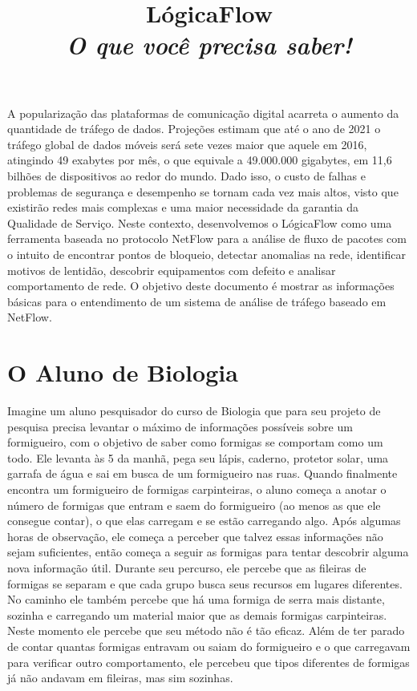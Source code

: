 \documentclass[twocolumn, letterpaper]{scrartcl}
\begin{document}
    \title{\color{triton_blue}LógicaFlow\\ \textit{O que você precisa saber!}}
    \date{}

	\maketitle

A popularização das plataformas de comunicação digital acarreta o aumento da quantidade de tráfego de dados. Projeções estimam que até o ano de 2021 o tráfego global de dados móveis será sete vezes maior que aquele em 2016, atingindo 49 exabytes por mês, o que equivale a 49.000.000 gigabytes, em 11,6 bilhões de dispositivos ao redor do mundo. Dado isso, o custo de falhas e problemas de segurança e desempenho se tornam cada vez mais altos, visto que existirão redes mais complexas e uma maior necessidade da garantia da Qualidade de Serviço. Neste contexto, desenvolvemos o LógicaFlow como uma ferramenta baseada no protocolo NetFlow para a análise de fluxo de pacotes com o intuito de encontrar pontos de bloqueio, detectar anomalias na rede, identificar motivos de lentidão, descobrir equipamentos com defeito e analisar comportamento de rede. O objetivo deste documento é mostrar as informações básicas para o entendimento de um sistema de análise de tráfego baseado em NetFlow.%

	
\section*{\color{triton_blue}O Aluno de Biologia}

 
Imagine um aluno pesquisador do curso de Biologia que para seu projeto de pesquisa precisa levantar o máximo de informações possíveis sobre um formigueiro, com o objetivo de saber como formigas se comportam como um todo. Ele levanta às 5 da manhã, pega seu lápis, caderno, protetor solar, uma garrafa de água e sai em busca de um formigueiro nas ruas. Quando finalmente encontra um formigueiro de formigas carpinteiras, o aluno começa a anotar o número de formigas que entram e saem do formigueiro (ao menos as que ele consegue contar), o que elas carregam e se estão carregando algo. Após algumas horas de observação, ele começa a perceber que talvez essas informações não sejam suficientes, então começa a seguir as formigas para tentar descobrir alguma nova informação útil. Durante seu percurso, ele percebe que as fileiras de formigas se separam e que cada grupo busca seus recursos em lugares diferentes. No caminho ele também percebe que há uma formiga de serra mais distante, sozinha e carregando um material maior que as demais formigas carpinteiras. Neste momento ele percebe que seu método não é tão eficaz. Além de ter parado de contar quantas formigas entravam ou saiam do formigueiro e o que carregavam para verificar outro comportamento, ele percebeu que tipos diferentes de formigas já não andavam em fileiras, mas sim sozinhas. 
\end{document}
